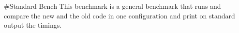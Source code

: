\#\+Standard Bench This benchmark is a general benchmark that runs and compare the new and the old code in one configuration and print on standard output the timings. 